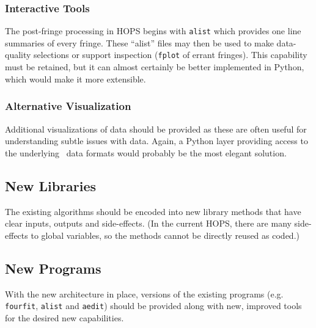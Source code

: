 \subsubsection{Interactive Tools}
\label{sec:aedit}
The post-fringe processing in HOPS begins with \texttt{alist} which provides
one line summaries of every fringe.  These ``alist'' files may then be
used to make data-quality selections or support inspection (\texttt{fplot} of
errant fringes).  This capability must be retained, but it can almost certainly
be better implemented in Python, which would make it more extensible.

\subsubsection{Alternative Visualization}
\label{sec:alternatives}
Additional visualizations of data should be provided as these are often
useful for understanding subtle issues with data.  Again, a Python layer
providing access to the underlying \nuHOPS~data formats would probably be
the most elegant solution.

\subsection{New Libraries}
\label{sec:libes}
The existing algorithms should be encoded into new library methods
that have clear inputs, outputs and side-effects.  (In the current
HOPS, there are many side-effects to global variables, so the methods
cannot be directly reused as coded.)

\subsection{New Programs}
\label{sec:progs}
With the new architecture in place, versions of the existing programs
(e.g. \texttt{fourfit}, \texttt{alist} and \texttt{aedit}) should be
provided along with new, improved tools for the desired new capabilities.

%
%
